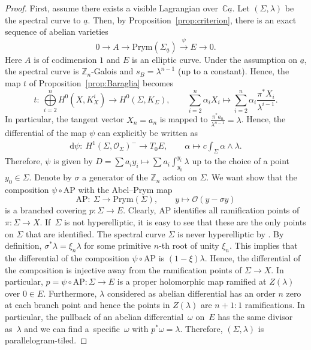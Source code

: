 \documentclass[10pt,a4paper]{amsart}
\numberwithin{equation}{section}
\theoremstyle{definition}
\renewcommand{\to}{\rightarrow}
\newcommand{\calO}{\mathcal{O}}
\newcommand{\ZZ}{\mathbb{Z}}
\newcommand{\CC}{\mathbb{C}}
\renewcommand{\d}{\mathrm{d}}
\newcommand{\Prym}{\mathrm{Prym}}
\begin{document}
\begin{proof}
 First, assume there exists a visible Lagrangian over~$\CC\underline{a}$. Let $(\Sigma,\lambda)$ be the spectral curve to $\underline{a}$. Then, by Proposition~\ref{prop:criterion}, there is an exact sequence of abelian varieties
 \[ 0 \to A \to \Prym(\Sigma_{\underline{a}}) \xrightarrow{\psi} E \to 0.
 \]
 Here $A$ is of codimension $1$ and $E$ is an elliptic curve. Under the assumption on $\underline{a}$, the spectral curve is $\ZZ_n$-Galois and $s_B=\lambda^{n-1}$ (up to a constant). Hence, the map $t$ of Proposition~\ref{prop:Baraglia} becomes
 \[ t\colon \ \bigoplus\limits_{i=2}^n H^0(X,K_X^i) \to H^0(\Sigma,K_\Sigma), \qquad \sum\limits_{i=2}^n \alpha_i X_i \mapsto \sum\limits_{i=2}^n \alpha_i \frac{\pi^*X_i}{\lambda^{i-1}}.
 \] In particular, the tangent vector $X_n=a_n$ is mapped to $\frac{\pi^*a_n}{\lambda^{n-1}}=\lambda$.
 Hence, the differential of the map $\psi$ can explicitly be written as
 \begin{align} \d \psi\colon \ H^1(\Sigma, \calO_\Sigma)^- \to T_0E, \qquad \alpha \mapsto c \int_\Sigma \alpha \wedge \lambda. \label{one-form}
 \end{align}
 Therefore, $\psi$ is given by $D=\sum a_i y_i \mapsto \sum a_i\int_{y_0}^{y_i} \lambda$ up to the choice of a point $y_0 \in \Sigma$. Denote by $\sigma$ a generator of the $\ZZ_n$ action on $\Sigma$. We want show that the composition $\psi \circ \mathrm{AP}$ with the Abel--Prym map
 \[ \mathrm{AP}\colon \ \Sigma \to \Prym(\Sigma), \qquad y \mapsto \calO(y-\sigma y)
 \]
 is a branched covering $p\colon \Sigma \to E$. Clearly, $\mathrm{AP}$ identifies all ramification points of $\pi\colon \Sigma \to X$. If~$\Sigma$ is not hyperelliptic, it is easy to see that these are the only points on $\Sigma$ that are identified. The spectral curve $\Sigma$ is never hyperelliptic by \cite[Lemma~4.1]{Baraglia}. By definition, $\sigma^*\lambda=\xi_n \lambda$ for some primitive $n$-th root of unity $\xi_n$. This implies that the differential of the composition $\psi \circ \mathrm{AP}$ is $(1-\xi) \lambda$. Hence, the differential of the composition is injective away from the ramification points of $\Sigma \to X$. In particular, $p=\psi \circ \mathrm{AP}\colon \Sigma \to E$ is a proper holomorphic map ramified at $Z(\lambda)$ over $0 \in E$. Furthermore, $\lambda$ considered as abelian differential has an order $n$ zero at each branch point and hence the points in $Z(\lambda)$ are $n+1:1$ ramifications. In particular, the pullback of an abelian differential~$\omega$ on~$E$ has the same divisor as~$\lambda$ and we can find a~specific~$\omega$ with $p^*\omega=\lambda$. Therefore, $(\Sigma,\lambda)$ is parallelogram-tiled.


\end{proof}
\end{document}
